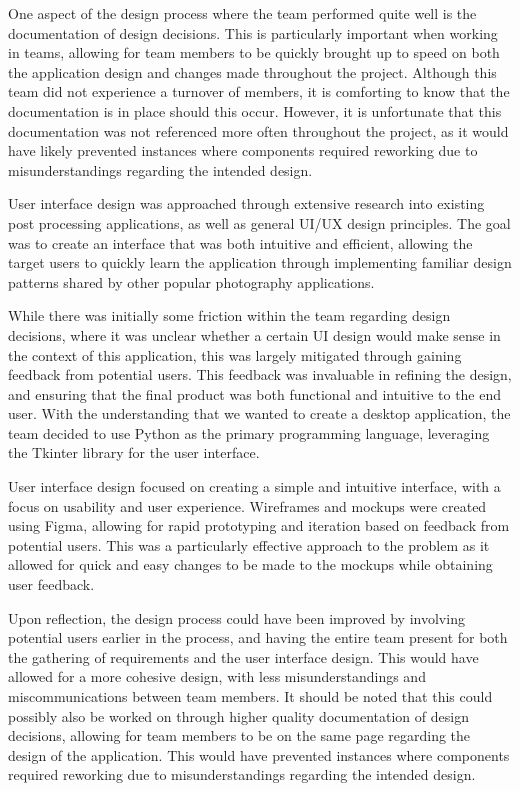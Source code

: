 \documentclass[conference]{IEEEtran}
\begin{document}
One aspect of the design process where the team performed quite well is the documentation of design decisions. This is particularly important when working in teams, allowing for team members to be quickly brought up to speed on both the application design and changes made throughout the project. Although this team did not experience a turnover of members, it is comforting to know that the documentation is in place should this occur. However, it is unfortunate that this documentation was not referenced more often throughout the project, as it would have likely prevented instances where components required reworking due to misunderstandings regarding the intended design. 

User interface design was approached through extensive research into existing post processing applications, as well as general UI/UX design principles. The goal was to create an interface that was both intuitive and efficient, allowing the target users to quickly learn the application through implementing familiar design patterns shared by other popular photography applications.

While there was initially some friction within the team regarding design decisions, where it was unclear whether a certain UI design would make sense in the context of this application, this was largely mitigated through gaining feedback from potential users. This feedback was invaluable in refining the design, and ensuring that the final product was both functional and intuitive to the end user.
With the understanding that we wanted to create a desktop application, the team decided to use Python as the primary programming language, leveraging the Tkinter library for the user interface.

User interface design focused on creating a simple and intuitive interface, with a focus on usability and user experience. Wireframes and mockups were created using Figma, allowing for rapid prototyping and iteration based on feedback from potential users. This was a particularly effective approach to the problem as it allowed for quick and easy changes to be made to the mockups while obtaining user feedback.

Upon reflection, the design process could have been improved by involving potential users earlier in the process, and having the entire team present for both the gathering of requirements and the user interface design. This would have allowed for a more cohesive design, with less misunderstandings and miscommunications between team members. It should be noted that this could possibly also be worked on through higher quality documentation of design decisions, allowing for team members to be on the same page regarding the design of the application. This would have prevented instances where components required reworking due to misunderstandings regarding the intended design. 
\end{document}
